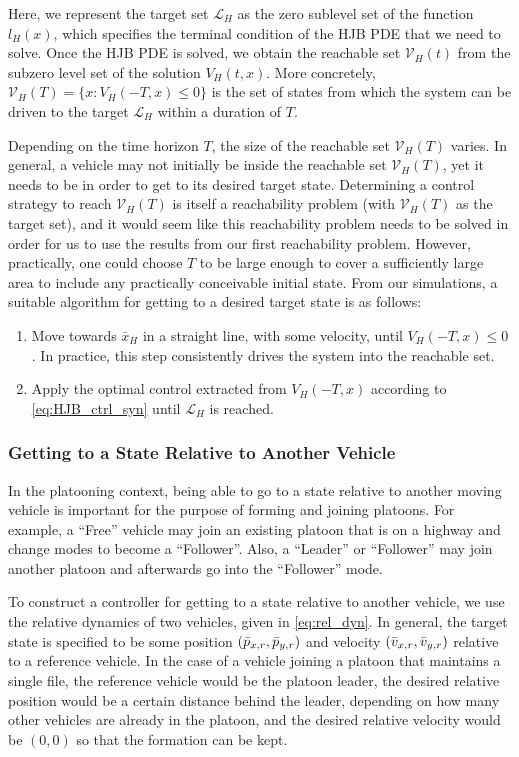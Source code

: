 Here, we represent the target set $\mathcal{L}_H$ as the zero sublevel set of the function $l_H(x)$, which specifies the terminal condition of the HJB PDE that we need to solve. Once the HJB PDE is solved, we obtain the reachable set $\mathcal V_H(t)$ from the subzero level set of the solution $V_H(t,x)$. More concretely, $\mathcal{V}_H(T) = \{x: V_H(-T,x)\le 0\}$ is the set of states from which the system can be driven to the target $\mathcal{L}_H$ within a duration of $T$. 

Depending on the time horizon $T$, the size of the reachable set $\mathcal V_H(T)$ varies. In general, a vehicle may not initially be inside the reachable set $\mathcal V_H(T)$, yet it needs to be in order to get to its desired target state. Determining a control strategy to reach $\mathcal V_H(T)$ is itself a reachability problem (with $\mathcal V_H(T)$ as the target set), and it would seem like this reachability problem needs to be solved in order for us to use the results from our first reachability problem. However, practically, one could choose $T$ to be large enough to cover a sufficiently large area to include any practically conceivable initial state. From our simulations, a suitable algorithm for getting to a desired target state is as follows:

\begin{enumerate}
\item Move towards $\bar{x}_H$ in a straight line, with some velocity, until $V_H(-T,x)\le 0$. In practice, this step consistently drives the system into the reachable set.
\item Apply the optimal control extracted from $V_H(-T,x)$ according to \eqref{eq:HJB_ctrl_syn} until $\mathcal{L}_H$ is reached.
\end{enumerate}

\subsubsection{Getting to a State Relative to Another Vehicle \label{sec:rel_target_ctrl}}
In the platooning context, being able to go to a state relative to another moving vehicle is important for the purpose of forming and joining platoons. For example, a ``Free'' vehicle may join an existing platoon that is on a highway and change modes to become a ``Follower''. Also, a ``Leader'' or ``Follower'' may join another platoon and afterwards go into the ``Follower'' mode.

To construct a controller for getting to a state relative to another vehicle, we use the relative dynamics of two vehicles, given in \eqref{eq:rel_dyn}. In general, the target state is specified to be some position $(\bar{p}_{x,r}, \bar{p}_{y,r})$ and velocity $(\bar{v}_{x,r}, \bar{v}_{y,r})$ relative to a reference vehicle. In the case of a vehicle joining a platoon that maintains a single file, the reference vehicle would be the platoon leader, the desired relative position would be a certain distance behind the leader, depending on how many other vehicles are already in the platoon, and the desired relative velocity would be $(0,0)$ so that the formation can be kept.


